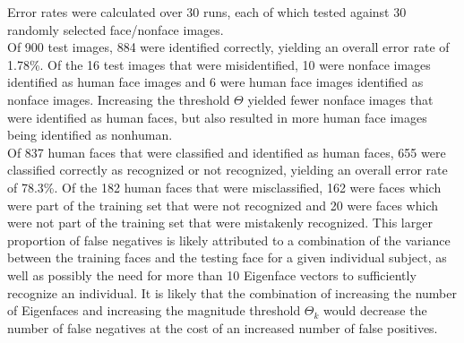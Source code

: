 \documentclass[11pt]{article}
\begin{document}
\noindent
Error rates were calculated over 30 runs, each of which tested against 30 randomly selected face/nonface images.\\
 
\noindent
Of 900 test images, 884 were identified correctly, yielding an overall error rate of 1.78\%. Of the 16 test images that were misidentified, 10 were nonface images identified as human face images and 6 were human face images identified as nonface images. Increasing the threshold $\Theta$ yielded fewer nonface images that were identified as human faces, but also resulted in more human face images being identified as nonhuman.\\

\noindent
Of 837 human faces that were classified and identified as human faces, 655 were classified correctly as recognized or not recognized, yielding an overall error rate of 78.3\%. Of the 182 human faces that were misclassified, 162 were faces which were part of the training set that were not recognized and 20 were faces which were not part of the training set that were mistakenly recognized. This larger proportion of false negatives is likely attributed to a combination of the variance between the training faces and the testing face for a given individual subject, as well as possibly the need for more than 10 Eigenface vectors to sufficiently recognize an individual. It is likely that the combination of increasing the number of Eigenfaces and increasing the magnitude threshold $\Theta_k$ would decrease the number of false negatives at the cost of an increased number of false positives.
\end{document}

